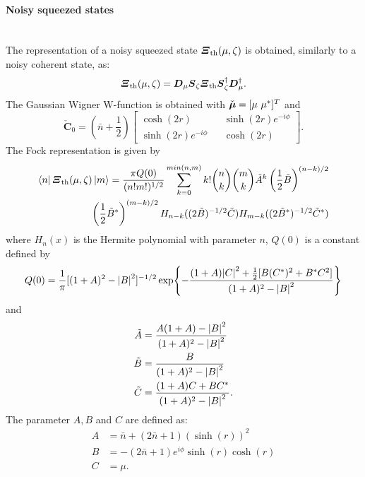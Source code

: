         \paragraph{Noisy squeezed states}\mbox{} \\
        The representation of a noisy squeezed state $\Operator{\varXi}_{\mathrm{th}}(\mu,\zeta)$ is obtained,
        similarly to a noisy coherent state, as:
        \begin{equation}
            \Operator{\varXi}_{\mathrm{th}}(\mu,\zeta)=\Operator{D}_\mu\Operator{S}_\zeta\Operator{\varXi}_{\mathrm{th}}
            \Operator{S}_\zeta^\dagger\Operator{D}_\mu^\dagger.
        \end{equation}
        The Gaussian Wigner W-function is obtained with $\check{\Vector{\mu}}=[\mu\ \mu^*]^T$ and
        \begin{equation}
            \check{\pmb{C}}_0=\left(\bar{n}+\frac{1}{2}\right)
            \begin{bmatrix}
                \cosh(2r) && \sinh(2r)e^{-i\phi}\\
                \sinh(2r)e^{-i\phi} && \cosh(2r)
            \end{bmatrix}.
            \label{eq:WignerSS}
        \end{equation}
        The Fock representation is given by \cite{MarMar_1993}
        \begin{equation}\begin{split}
            \bra{n}\Operator{\varXi}_{\mathrm{th}}(\mu,\zeta)\ket{m}=\frac{\pi Q(0)}{(n!m!)^{1/2}}
            \sum_{k=0}^{min(n,m)} k! \binom{n}{k}\binom{m}{k} \tilde{A}^k\left(\frac{1}{2}
            \tilde{B}\right)^{(n-k)/2}\\ \left(\frac{1}{2}\tilde{B}^*\right)^{(m-k)/2}
            H_{n-k}((2\tilde{B})^{-1/2}\tilde{C}) H_{m-k}((2\tilde{B}^*)^{-1/2}\tilde{C}^*) 
            \label{FR_NSS}
        \end{split}\end{equation}
        where $H_n(x)$ is the Hermite polynomial with parameter $n$, $Q(0)$ is a constant defined by
        \begin{equation}
            Q(0) = \frac{1}{\pi}[(1+A)^2-\absolutevalue{B}^2]^{-1/2}\exp{-\frac{(1+A)\absolutevalue{C}^2
            +\frac{1}{2}[B(C^*)^2+B^*C^2]}{(1+A)^2-\absolutevalue{B}^2}}
        \end{equation}
        and
        \begin{equation}
            \begin{aligned}
            \tilde{A} &= \frac{A(1+A)-\absolutevalue{B}^2}{(1+A)^2-\absolutevalue{B}^2}\\
            \tilde{B} &= \frac{B}{(1+A)^2-\absolutevalue{B}^2}\\
            \tilde{C} &= \frac{(1+A)C+BC^*}{(1+A)^2-\absolutevalue{B}^2}.
            \end{aligned}
        \end{equation}
        The parameter $A,B$ and $C$ are defined as:
        \begin{equation}
            \begin{split}
            A&=\bar{n}+(2\bar{n}+1)(\sinh(r))^2\\
            B&=-(2\bar{n}+1)e^{i\phi}\sinh(r)\cosh(r)\\
            C&=\mu.
            \end{split}
        \end{equation}